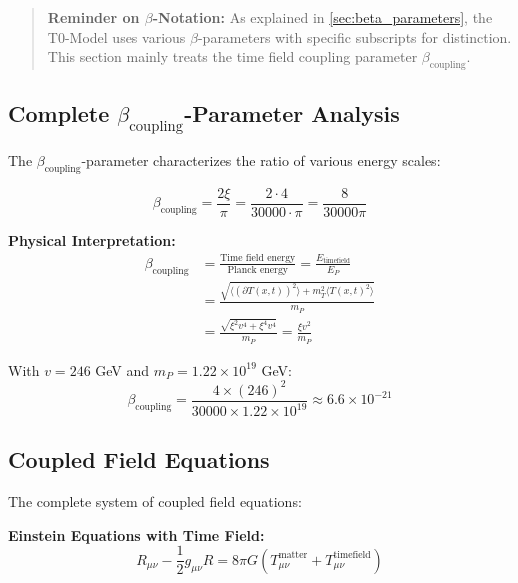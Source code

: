 \documentclass[12pt,a4paper]{report}
\newcommand{\Tfield}{T(x,t)}  %
\newcommand{\xipar}{\xi}      %
\begin{document}
	\begin{quote}
		\textbf{Reminder on $\beta$-Notation:} As explained in \autoref{sec:beta_parameters}, the T0-Model uses various $\beta$-parameters with specific subscripts for distinction. This section mainly treats the time field coupling parameter $\beta_{\text{coupling}}$.
	\end{quote}
	
	\subsection{Complete $\beta_{\text{coupling}}$-Parameter Analysis}\label{subsec:complete_beta_analysis}
	
	The $\beta_{\text{coupling}}$-parameter characterizes the ratio of various energy scales:
	
	\begin{equation}\label{eq:beta_parameter_complete}
		\beta_{\text{coupling}} = \frac{2\xipar}{\pi} = \frac{2 \cdot 4}{30000 \cdot \pi} = \frac{8}{30000\pi}
	\end{equation}
	
	\textbf{Physical Interpretation:}
	\begin{align}
		\beta_{\text{coupling}} &= \frac{\text{Time field energy}}{\text{Planck energy}} = \frac{E_{\text{timefield}}}{E_P} \\
		&= \frac{\sqrt{\langle (\partial \Tfield)^2 \rangle + m_T^2 \langle \Tfield^2 \rangle}}{m_P} \\
		&= \frac{\sqrt{\xipar^2 v^4 + \xipar^4 v^4}}{m_P} = \frac{\xipar v^2}{m_P}
	\end{align}
	
	With $v = 246$ GeV and $m_P = 1.22 \times 10^{19}$ GeV:
	\begin{equation}
		\beta_{\text{coupling}} = \frac{4 \times (246)^2}{30000 \times 1.22 \times 10^{19}} \approx 6.6 \times 10^{-21}
	\end{equation}
	
	\subsection{Coupled Field Equations}\label{subsec:coupled_field_equations}
	
	The complete system of coupled field equations:
	
	\textbf{Einstein Equations with Time Field:}
	\begin{equation}\label{eq:einstein_timefield}
		R_{\mu\nu} - \frac{1}{2} g_{\mu\nu} R = 8\pi G \left(T_{\mu\nu}^{\text{matter}} + T_{\mu\nu}^{\text{timefield}}\right)
	\end{equation}
	
\end{document}
